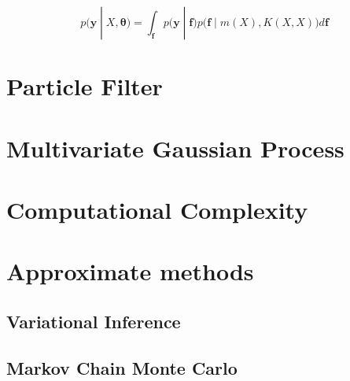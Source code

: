 \begin{equation}
    p(\boldsymbol{y} \; | \; X, \boldsymbol{\theta}) = \int_{\boldsymbol{f}} p\big(\boldsymbol{y} \;| \; \boldsymbol{f}\big) p\big(\boldsymbol{f} \; |\; m(X), K(X, X)\big) d\boldsymbol{f}
\end{equation}











\section{Particle Filter}
\section{Multivariate Gaussian Process}
\section{Computational Complexity}
\section{Approximate methods}
\subsection{Variational Inference}
\subsection{Markov Chain Monte Carlo}
